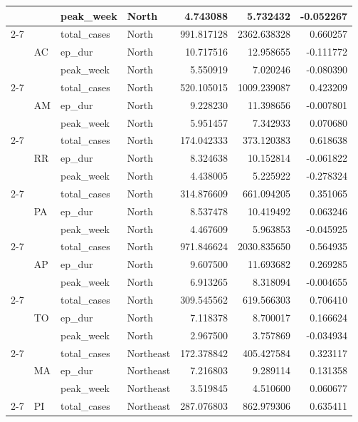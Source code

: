 \documentclass{report}
\begin{document}
\begin{center}
\begin{center}
\begin{longtable}{llllrrr}
 &  & peak\_week & North & 4.743088 & 5.732432 & -0.052267 \\
\cline{2-7}
 & \multirow[t]{3}{*}{AC} & total\_cases & North & 991.817128 & 2362.638328 & 0.660257 \\
 &  & ep\_dur & North & 10.717516 & 12.958655 & -0.111772 \\
 &  & peak\_week & North & 5.550919 & 7.020246 & -0.080390 \\
\cline{2-7}
 & \multirow[t]{3}{*}{AM} & total\_cases & North & 520.105015 & 1009.239087 & 0.423209 \\
 &  & ep\_dur & North & 9.228230 & 11.398656 & -0.007801 \\
 &  & peak\_week & North & 5.951457 & 7.342933 & 0.070680 \\
\cline{2-7}
 & \multirow[t]{3}{*}{RR} & total\_cases & North & 174.042333 & 373.120383 & 0.618638 \\
 &  & ep\_dur & North & 8.324638 & 10.152814 & -0.061822 \\
 &  & peak\_week & North & 4.438005 & 5.225922 & -0.278324 \\
\cline{2-7}
 & \multirow[t]{3}{*}{PA} & total\_cases & North & 314.876609 & 661.094205 & 0.351065 \\
 &  & ep\_dur & North & 8.537478 & 10.419492 & 0.063246 \\
 &  & peak\_week & North & 4.467609 & 5.963853 & -0.045925 \\
\cline{2-7}
 & \multirow[t]{3}{*}{AP} & total\_cases & North & 971.846624 & 2030.835650 & 0.564935 \\
 &  & ep\_dur & North & 9.607500 & 11.693682 & 0.269285 \\
 &  & peak\_week & North & 6.913265 & 8.318094 & -0.004655 \\
\cline{2-7}
 & \multirow[t]{3}{*}{TO} & total\_cases & North & 309.545562 & 619.566303 & 0.706410 \\
 &  & ep\_dur & North & 7.118378 & 8.700017 & 0.166624 \\
 &  & peak\_week & North & 2.967500 & 3.757869 & -0.034934 \\
\cline{2-7}
 & \multirow[t]{3}{*}{MA} & total\_cases & Northeast & 172.378842 & 405.427584 & 0.323117 \\
 &  & ep\_dur & Northeast & 7.216803 & 9.289114 & 0.131358 \\
 &  & peak\_week & Northeast & 3.519845 & 4.510600 & 0.060677 \\
\cline{2-7}
 & \multirow[t]{3}{*}{PI} & total\_cases & Northeast & 287.076803 & 862.979306 & 0.635411 \\

\end{longtable}
\end{center}
\end{center}
\end{document}
